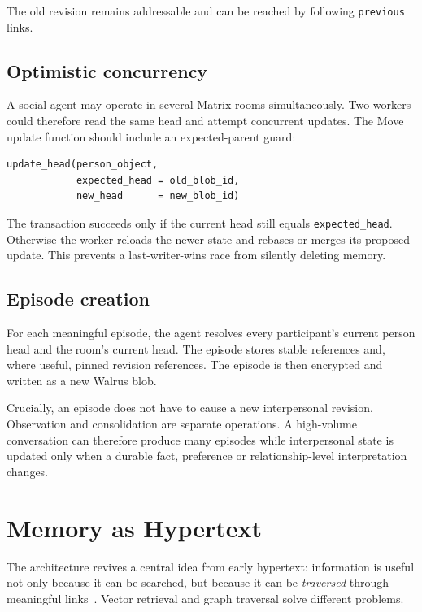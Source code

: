 \documentclass[11pt]{article}
\begin{document}
The old revision remains addressable and can be reached by following \texttt{previous} links.

\subsection{Optimistic concurrency}

A social agent may operate in several Matrix rooms simultaneously. Two workers could therefore read the same head and attempt concurrent updates. The Move update function should include an expected-parent guard:

\begin{lstlisting}
update_head(person_object,
            expected_head = old_blob_id,
            new_head      = new_blob_id)
\end{lstlisting}

The transaction succeeds only if the current head still equals \texttt{expected\_head}. Otherwise the worker reloads the newer state and rebases or merges its proposed update. This prevents a last-writer-wins race from silently deleting memory.

\subsection{Episode creation}

For each meaningful episode, the agent resolves every participant's current person head and the room's current head. The episode stores stable references and, where useful, pinned revision references. The episode is then encrypted and written as a new Walrus blob.

Crucially, an episode does not have to cause a new interpersonal revision. Observation and consolidation are separate operations. A high-volume conversation can therefore produce many episodes while interpersonal state is updated only when a durable fact, preference or relationship-level interpretation changes.

\section{Memory as Hypertext}

The architecture revives a central idea from early hypertext: information is useful not only because it can be searched, but because it can be \emph{traversed} through meaningful links~\cite{bush,nelson}. Vector retrieval and graph traversal solve different problems.
\end{document}
